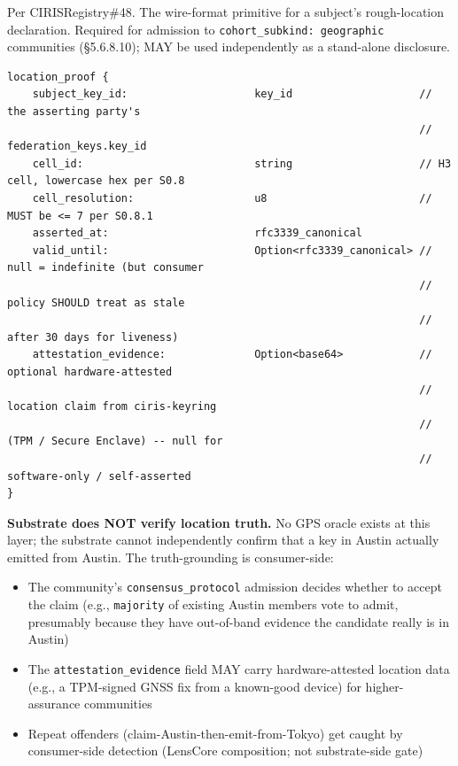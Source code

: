\documentclass[10pt]{article}
\begin{document}
Per CIRISRegistry\#48. The wire-format primitive for a subject's rough-location declaration. Required for admission to \texttt{cohort\_subkind: geographic} communities (§5.6.8.10); MAY be used independently as a stand-alone disclosure.


\begin{lstlisting}
location_proof {
    subject_key_id:                    key_id                    // the asserting party's
                                                                 //   federation_keys.key_id
    cell_id:                           string                    // H3 cell, lowercase hex per S0.8
    cell_resolution:                   u8                        // MUST be <= 7 per S0.8.1
    asserted_at:                       rfc3339_canonical
    valid_until:                       Option<rfc3339_canonical> // null = indefinite (but consumer
                                                                 //   policy SHOULD treat as stale
                                                                 //   after 30 days for liveness)
    attestation_evidence:              Option<base64>            // optional hardware-attested
                                                                 //   location claim from ciris-keyring
                                                                 //   (TPM / Secure Enclave) -- null for
                                                                 //   software-only / self-asserted
}
\end{lstlisting}

\textbf{Substrate does NOT verify location truth.} No GPS oracle exists at this layer; the substrate cannot independently confirm that a key in Austin actually emitted from Austin. The truth-grounding is consumer-side:


\begin{itemize}\setlength\itemsep{0pt}
\item The community's \texttt{consensus\_protocol} admission decides whether to accept the claim (e.g., \texttt{majority} of existing Austin members vote to admit, presumably because they have out-of-band evidence the candidate really is in Austin)
\item The \texttt{attestation\_evidence} field MAY carry hardware-attested location data (e.g., a TPM-signed GNSS fix from a known-good device) for higher-assurance communities
\item Repeat offenders (claim-Austin-then-emit-from-Tokyo) get caught by consumer-side detection (LensCore composition; not substrate-side gate)
\end{itemize}
\end{document}
